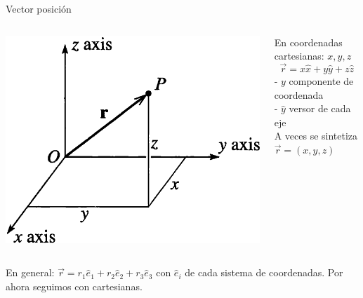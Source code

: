 \documentclass[serif]{beamer}
\begin{document}
\begin{frame}
\begin{block}{Vector posición}
\begin{columns}[c]
      \begin{column}{0.65\textwidth}
        \includegraphics[width=\textwidth]{taylor1_1}
        \end{column}
        \begin{column}{0.35\textwidth}
En coordenadas cartesianas: \(x,y,z\)
\[
\vec{r}= x \hat{x}+ y \hat{y}+ z \hat{z}
\]
\pause
- \(y\) componente de coordenada\\
- \(\hat{y}\) versor de cada eje\\
\bigskip
\pause
A veces se sintetiza
\(\vec{r}= (x,y,z)\)
\end{column}
\end{columns}
\end{block}
\pause
\begin{block}{}
En general: \(\vec{r}= r_1 \hat{e}_1 +  r_2 \hat{e}_2 + r_3 \hat{e}_3\) con \(\hat{e}_i\) de cada sistema de coordenadas.
Por ahora seguimos con cartesianas.
\end{block}
\end{frame}
\end{document}
